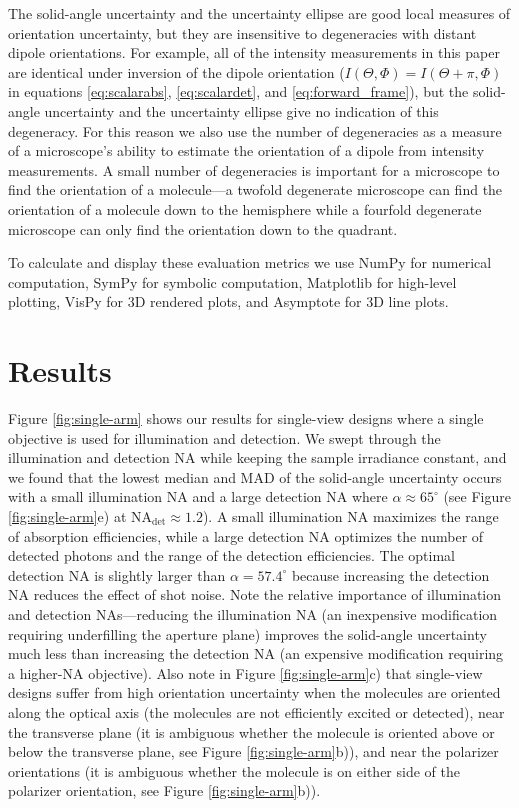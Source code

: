 \documentclass[10pt]{article}
\begin{document}
The solid-angle uncertainty and the uncertainty ellipse are good local measures
of orientation uncertainty, but they are insensitive to degeneracies with
distant dipole orientations. For example, all of the intensity measurements in
this paper are identical under inversion of the dipole orientation
($I(\Theta, \Phi) = I(\Theta + \pi, \Phi)$ in equations \ref{eq:scalarabs},
\ref{eq:scalardet}, and \ref{eq:forward_frame}), but the solid-angle uncertainty
and the uncertainty ellipse give no indication of this degeneracy. For this
reason we also use the number of degeneracies as a measure of a microscope's
ability to estimate the orientation of a dipole from intensity measurements. A
small number of degeneracies is important for a microscope to find the
orientation of a molecule---a twofold degenerate microscope can find the
orientation of a molecule down to the hemisphere while a fourfold degenerate
microscope can only find the orientation down to the quadrant.

To calculate and display these evaluation metrics we use NumPy \cite{walt2011}
for numerical computation, SymPy \cite{meurer2017} for symbolic computation,
Matplotlib \cite{hunter2007} for high-level plotting, VisPy \cite{vispy} for 3D
rendered plots, and Asymptote \cite{bowman2008} for 3D line plots.

\section{Results}\label{results}
Figure \ref{fig:single-arm} shows our results for single-view designs where a
single objective is used for illumination and detection. We swept through the
illumination and detection NA while keeping the sample irradiance constant, and
we found that the lowest median and MAD of the solid-angle uncertainty occurs
with a small illumination NA and a large detection NA where
$\alpha \approx 65^{\circ}$ (see Figure \ref{fig:single-arm}e) at
NA${}_{\text{det}} \approx 1.2$). A small illumination NA maximizes the range of
absorption efficiencies, while a large detection NA optimizes the number of
detected photons and the range of the detection efficiencies. The optimal
detection NA is slightly larger than $\alpha = 57.4^{\circ}$ because increasing
the detection NA reduces the effect of shot noise. Note the relative importance
of illumination and detection NAs---reducing the illumination NA (an inexpensive
modification requiring underfilling the aperture plane) improves the solid-angle
uncertainty much less than increasing the detection NA (an expensive
modification requiring a higher-NA objective). Also note in Figure
\ref{fig:single-arm}c) that single-view designs suffer from high orientation
uncertainty when the molecules are oriented along the optical axis (the
molecules are not efficiently excited or detected), near the transverse plane
(it is ambiguous whether the molecule is oriented above or below the transverse
plane, see Figure \ref{fig:single-arm}b)), and near the polarizer orientations
(it is ambiguous whether the molecule is on either side of the polarizer
orientation, see Figure \ref{fig:single-arm}b)).
\end{document}
